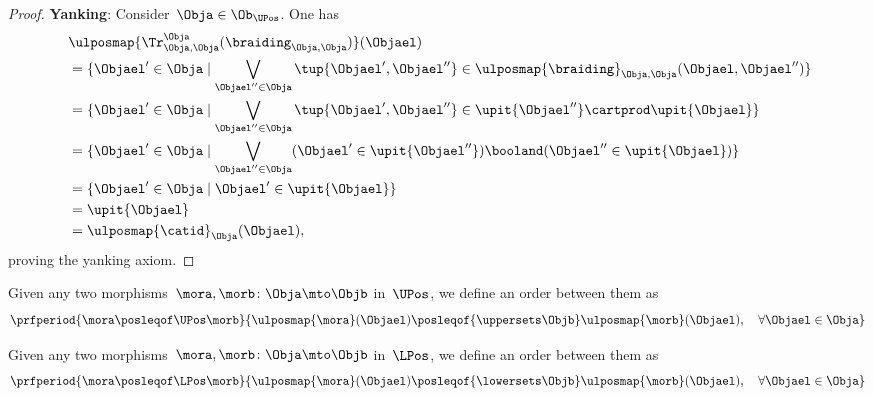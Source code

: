 \begin{proof}
    \textbf{Yanking}:
    Consider~$\Obja\in \Ob_{\UPos}$.
    One has
    \begin{equation*}
        \begin{aligned}
            ~ & \ulposmap{\Tr_{\Obja,\Obja}^{\Obja}(\braiding_{\Obja,\Obja})}(\Objael)                                                                     \\
              & =\{ \Objael'\in \Obja \mid \bigvee_{\Objael''\in \Obja}\tup{\Objael',\Objael''}\in \ulposmap{\braiding}_{\Obja,\Obja}(\Objael,\Objael'')\} \\
              & =\{ \Objael'\in \Obja \mid \bigvee_{\Objael''\in \Obja}\tup{\Objael',\Objael''}\in \upit\{\Objael''\}\cartprod \upit\{ \Objael\}\}         \\
              & =\{ \Objael'\in \Obja \mid \bigvee_{\Objael''\in \Obja} (\Objael'\in \upit\{\Objael''\}) \booland(\Objael'' \in \upit\{ \Objael\})\}       \\
              & =\{ \Objael'\in \Obja \mid \Objael'\in \upit\{\Objael\}\}                                                                                  \\
              & =\upit \{\Objael\}                                                                                                                         \\
              & =\ulposmap{\catid}_\Obja(\Objael),
        \end{aligned}
    \end{equation*}
    proving the yanking axiom.
\end{proof}

\begin{definition}
    \label{def:upos_order}
    Given any two morphisms~$\mora,\morb\colon \Obja \mto \Objb$ in~$\UPos$, we define an order between them as
    \begin{equation*}
        \prfperiod{\mora \posleqof\UPos \morb}{\ulposmap{\mora}(\Objael)\posleqof{\uppersets \Objb} \ulposmap{\morb}(\Objael), \quad \forall \Objael \in \Obja}
    \end{equation*}
\end{definition}

\begin{definition}
    \label{def:lpos_order}
    Given any two morphisms~$\mora,\morb\colon \Obja \mto \Objb$ in~$\LPos$, we define an order between them as
    \begin{equation*}
        \prfperiod{\mora \posleqof\LPos \morb}{\ulposmap{\mora}(\Objael)\posleqof{\lowersets \Objb} \ulposmap{\morb}(\Objael), \quad \forall \Objael \in \Obja}
    \end{equation*}
\end{definition}

